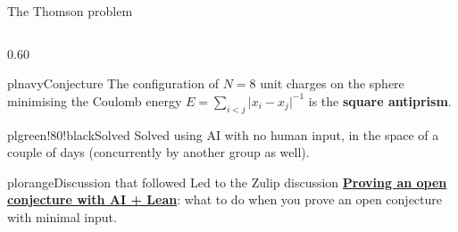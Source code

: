 \documentclass[aspectratio=169,10pt]{beamer}
\newcommand{\plbody}{\small}
\begin{document}
\begin{frame}{The Thomson problem}
  \vfill
  \begin{columns}[c,onlytextwidth]

    \begin{column}{0.60\textwidth}
      \begin{plcard}[top=4pt,bottom=4pt]{plnavy}{Conjecture}
        \plbody
        The configuration of $N = 8$ unit charges on the sphere minimising the
        Coulomb energy $E = \sum_{i<j} \lvert x_i - x_j \rvert^{-1}$
        is the \textbf{square antiprism}.
      \end{plcard}

      \begin{plcard}[top=4pt,bottom=4pt,before skip=2pt]{plgreen!80!black}{Solved}
        \plbody
        Solved using AI with no human input, in the space of a couple of
        days (concurrently by another group as well).
      \end{plcard}

      \begin{plcard}[top=4pt,bottom=4pt,before skip=2pt]{plorange}{Discussion that followed}
        \plbody
        Led to the Zulip discussion
        \href{https://leanprover.zulipchat.com/\#narrow/channel/113488-general/topic/Proving.20an.20open.20conjecture.20with.20AI.20.2B.20Lean/near/624336071}{\textbf{\color{plember}\;Proving an open
        conjecture with AI + Lean}}: what to do when you prove an open
        conjecture with minimal input.
      \end{plcard}
    \end{column}


\end{columns}
\end{frame}
\end{document}
